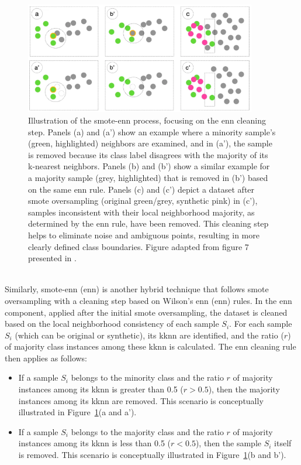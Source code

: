 \documentclass[12pt,a4paper]{report}
\begin{document}
\begin{figure}[h!]
  \centering
  \includegraphics[width=0.9\textwidth]{images/SMOTE-EEN.png}
  \caption[Illustration of \gls{smote}-\acrshort{enn} Process]{Illustration of the \gls{smote}-\acrshort{enn} process, focusing on the \gls{enn} cleaning step. Panels (a) and (a') show an example where a minority sample's (green, highlighted) neighbors are examined, and in (a'), the sample is removed because its class label disagrees with the majority of its k-nearest neighbors. Panels (b) and (b') show a similar example for a majority sample (grey, highlighted) that is removed in (b') based on the same \gls{enn} rule. Panels (c) and (c') depict a dataset after \gls{smote} oversampling (original green/grey, synthetic pink) in (c'), samples inconsistent with their local neighborhood majority, as determined by the \gls{enn} rule, have been removed. This cleaning step helps to eliminate noise and ambiguous points, resulting in more clearly defined class boundaries. Figure adapted from figure 7 presented in \cite{Truong2022SMOTEVariants}.}
  \label{fig:SMOTE-ENN} %
\end{figure}
\\
\noindent
Similarly, \gls{smote}-\gls{enn} (\acrlong{enn}) \cite{Batista2004Study} is another hybrid technique that follows \gls{smote} oversampling with a cleaning step based on Wilson’s \acrlong{enn} (\gls{enn}) rules. In the \gls{enn} component, applied after the initial \gls{smote} oversampling, the dataset is cleaned based on the local neighborhood consistency of each sample $S_i$. For each sample $S_i$ (which can be original or synthetic), its \gls{kknn} are identified, and the ratio ($r$) of majority class instances among these \acrshort{kknn} is calculated. The \gls{enn} cleaning rule then applies as follows:
\begin{itemize}
    \item If a sample $S_i$ belongs to the minority class and the ratio $r$ of majority instances among its \acrshort{kknn} is greater than 0.5 ($r > 0.5$), then the majority instances among its \acrshort{kknn} are removed. This scenario is conceptually illustrated in Figure~\ref{fig:SMOTE-ENN}(a and a').
    \item If a sample $S_i$ belongs to the majority class and the ratio $r$ of majority instances among its \acrshort{kknn} is less than 0.5 ($r < 0.5$), then the sample $S_i$ itself is removed. This scenario is conceptually illustrated in Figure~\ref{fig:SMOTE-ENN}(b and b').
\end{itemize}
\end{document}
